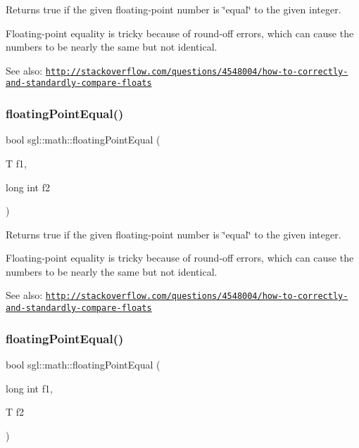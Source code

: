 Returns true if the given floating-\/point number is \char`\"{}equal\char`\"{} to the given integer. 

Floating-\/point equality is tricky because of round-\/off errors, which can cause the numbers to be nearly the same but not identical.

See also\+: \href{http://stackoverflow.com/questions/4548004/how-to-correctly-and-standardly-compare-floats}{\tt http\+://stackoverflow.\+com/questions/4548004/how-\/to-\/correctly-\/and-\/standardly-\/compare-\/floats} \mbox{\label{namespacesgl_1_1math_a9d31d4ec73028f15de956918e995ab8b}} 
\subsubsection{\texorpdfstring{floating\+Point\+Equal()}{floatingPointEqual()}\hspace{0.1cm}{\footnotesize\ttfamily [5/6]}}
{\footnotesize\ttfamily bool sgl\+::math\+::floating\+Point\+Equal (\begin{DoxyParamCaption}\item[{T}]{f1,  }\item[{long int}]{f2 }\end{DoxyParamCaption})}



Returns true if the given floating-\/point number is \char`\"{}equal\char`\"{} to the given integer. 

Floating-\/point equality is tricky because of round-\/off errors, which can cause the numbers to be nearly the same but not identical.

See also\+: \href{http://stackoverflow.com/questions/4548004/how-to-correctly-and-standardly-compare-floats}{\tt http\+://stackoverflow.\+com/questions/4548004/how-\/to-\/correctly-\/and-\/standardly-\/compare-\/floats} \mbox{\label{namespacesgl_1_1math_a7a7e3a5c83560704420311746c3f31ae}} 
\subsubsection{\texorpdfstring{floating\+Point\+Equal()}{floatingPointEqual()}\hspace{0.1cm}{\footnotesize\ttfamily [6/6]}}
{\footnotesize\ttfamily bool sgl\+::math\+::floating\+Point\+Equal (\begin{DoxyParamCaption}\item[{long int}]{f1,  }\item[{T}]{f2 }\end{DoxyParamCaption})}



